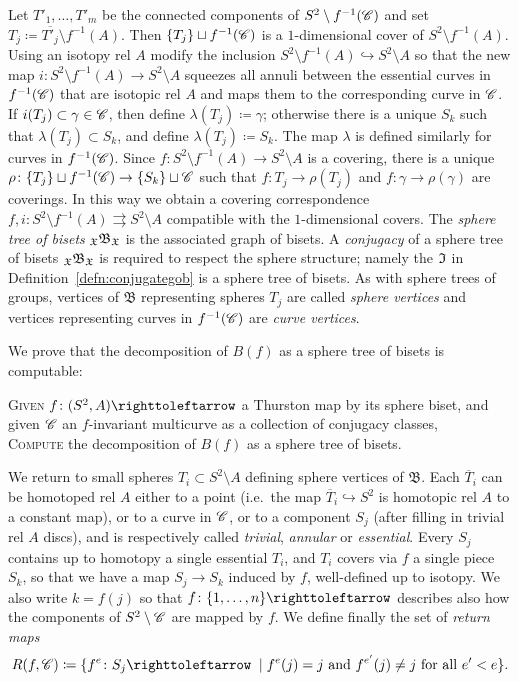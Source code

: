 \documentclass{amsart}
\begin{document}
Let $T'_1,\dots,T'_m$ be the connected components of
$S^2\setminus f^{-1}({\mathscr C})$ and set
$T_j\coloneqq \overline{T'_j}\setminus f^{-1}(A)$. Then
$\{T_j\}\sqcup f^{-1}({\mathscr C})$ is a $1$-dimensional cover of
$S^{2}\setminus f^{-1}(A)$. Using an isotopy rel $A$ modify the
inclusion $S^2\setminus f^{-1}(A)\hookrightarrow S^2\setminus A$ so
that the new map $i\colon S^2\setminus f^{-1}(A)\to S^2\setminus A$
squeezes all annuli between the essential curves in $f^{-1}({\mathscr C})$ that
are isotopic rel $A$ and maps them to the corresponding curve in
${\mathscr C}$. If $i(T_j)\subset \gamma\in {\mathscr C}$, then define
$\lambda(T_j)\coloneqq \gamma$; otherwise there is a unique $S_k$ such
that $\lambda(T_j)\subset S_k$, and define
$\lambda(T_j)\coloneqq S_k$. The map $\lambda$ is defined similarly
for curves in $f^{-1}({\mathscr C})$. Since
$f\colon S^2\setminus f^{-1}(A) \to S^2\setminus A$ is a covering,
there is a unique
$\rho \colon \{T_j\}\sqcup f^{-1}({\mathscr C})\to \{S_k\}\sqcup {\mathscr C} $ such
that $f\colon T_j\to \rho(T_j)$ and $f\colon \gamma\to \rho(\gamma)$
are coverings. In this way we obtain a covering correspondence
$f,i \colon S^2\setminus f^{-1}(A) \rightrightarrows S^2\setminus A$
compatible with the $1$-dimensional covers. The \emph{sphere tree of
  bisets} $\subscript \gf\gfB_{\gf}$ is the associated graph of
bisets. A \emph{conjugacy} of a sphere tree of bisets
$\subscript \gf\gfB_{\gf}$ is required to respect the sphere
structure; namely the ${\mathfrak I}$ in Definition~\ref{defn:conjugategob} is
a sphere tree of bisets. As with sphere trees of groups, vertices of
$\mathfrak B$ representing spheres $T_j$ are called \emph{sphere
  vertices} and vertices representing curves in $f^{-1}({\mathscr C})$ are
\emph{curve vertices}.

\noindent We prove that the decomposition of $B(f)$ as a sphere tree
of bisets is computable:
\begin{algo}\label{algo:decompose}
  \textsc{Given} $f\colon(S^2,A)\selfmap$ a Thurston map by its sphere biset, and given ${\mathscr C}$ an $f$-invariant multicurve as a collection of conjugacy classes,\\
  \textsc{Compute} the decomposition of $B(f)$ as a sphere tree of
  bisets.
\end{algo}

We return to small spheres $T_i\subset S^2\setminus A$ defining sphere
vertices of $\mathfrak B$.  Each $\overline T_i$ can be homotoped rel
$A$ either to a point (i.e.~the map $\overline T_i\hookrightarrow S^2$
is homotopic rel $A$ to a constant map), or to a curve in ${\mathscr C}$, or to
a component $S_j$ (after filling in trivial rel $A$ discs), and is
respectively called \emph{trivial}, \emph{annular} or
\emph{essential}. Every $S_j$ contains up to homotopy a single
essential $T_i$, and $T_i$ covers via $f$ a single piece $S_k$, so
that we have a map $S_j\to S_k$ induced by $f$, well-defined up to
isotopy. We also write $k=f(j)$ so that $f\colon\{1,\dots,n\}\selfmap$
describes also how the components of $S^2\setminus{\mathscr C}$ are mapped by
$f$. We define finally the set of \emph{return maps}
\[R(f,\CC)\coloneqq\{f^e\colon S_j\selfmap\;\mid f^e(j)=j\text{ and }f^{e'}(j)\neq j\text{ for all }e'<e\}.\]
\end{document}
